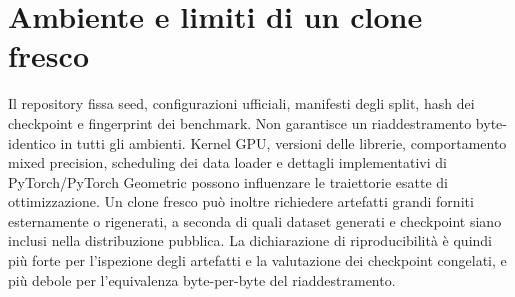 \section{Ambiente e limiti di un clone fresco}
\label{app:reproducibility:environment}

\enlargethispage{2\baselineskip}

Il repository fissa seed, configurazioni ufficiali, manifesti degli split, hash dei checkpoint e fingerprint dei benchmark.  Non garantisce un riaddestramento byte-identico in tutti gli ambienti.  Kernel GPU, versioni delle librerie, comportamento mixed precision, scheduling dei data loader e dettagli implementativi di PyTorch/PyTorch Geometric possono influenzare le traiettorie esatte di ottimizzazione.  Un clone fresco può inoltre richiedere artefatti grandi forniti esternamente o rigenerati, a seconda di quali dataset generati e checkpoint siano inclusi nella distribuzione pubblica.  La dichiarazione di riproducibilità è quindi più forte per l'ispezione degli artefatti e la valutazione dei checkpoint congelati, e più debole per l'equivalenza byte-per-byte del riaddestramento.
